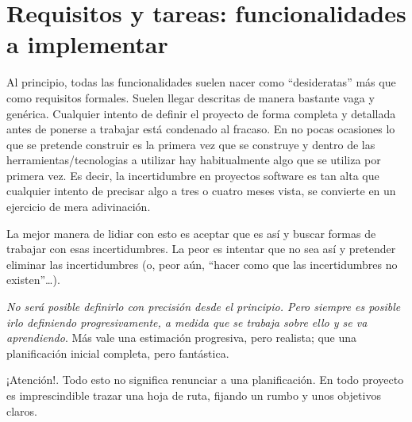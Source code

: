 \documentclass[spanish,12pt,a4paper,final,oneside]{book}
\begin{document}
\section{Requisitos y tareas: funcionalidades a implementar}
Al principio, todas las funcionalidades suelen nacer como ``desideratas'' más que como requisitos formales. Suelen llegar descritas de manera bastante vaga y genérica. Cualquier intento de  definir el proyecto de forma completa y detallada antes de ponerse a trabajar está condenado al fracaso. En no pocas ocasiones lo que se pretende construir es la primera vez que se construye y dentro de las herramientas/tecnologias a utilizar hay habitualmente algo que se utiliza por primera vez. Es decir, la incertidumbre en proyectos software es tan alta que cualquier intento de precisar algo a tres o cuatro meses vista, se convierte en un ejercicio de mera adivinación.

La mejor manera de lidiar con esto es aceptar que es así y buscar formas de trabajar con esas incertidumbres. La peor es intentar que no sea así y pretender eliminar las incertidumbres (o, peor aún, ``hacer como que las incertidumbres no existen''…).

\textit{No será posible definirlo con precisión desde el principio. Pero siempre es posible irlo definiendo progresivamente, a medida que se trabaja sobre ello y se va aprendiendo}. Más vale una estimación progresiva, pero realista; que una planificación inicial completa, pero fantástica.

¡Atención!. Todo esto no significa renunciar a una planificación. En todo proyecto es imprescindible trazar una hoja de ruta, fijando un rumbo y unos objetivos claros. 
\end{document}
